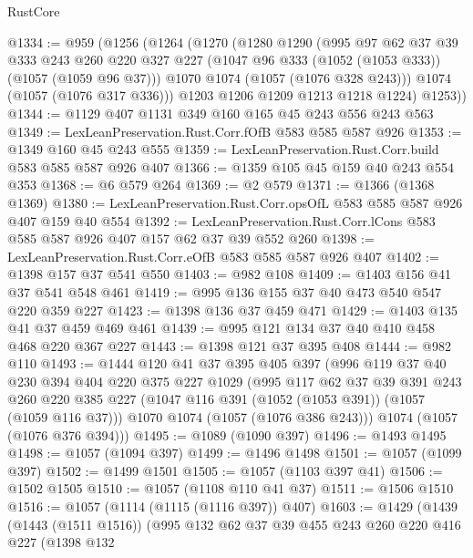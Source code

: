 \begin{lexlean}{RustCore}
\begin{coremodule}
@1334 := @959
    (@1256
      (@1264
        (@1270
          (@1280
            @1290
            (@995
              @97
              @62
              @37
              @39
              @333
              @243
              @260
              @220
              @327
              @227
              (@1047 @96 @333 (@1052 (@1053 @333)) (@1057 (@1059 @96 @37)))
              @1070
              @1074
              (@1057 (@1076 @328 @243)))
            @1074
            (@1057 (@1076 @317 @336)))
          @1203
          @1206
          @1209
          @1213
          @1218
          @1224)
        @1253))
@1344 := @1129 @407 @1131 @349 @160 @165 @45 @243 @556 @243 @563
@1349 := LexLeanPreservation.Rust.Corr.fOfB @583 @585 @587 @926
@1353 := @1349 @160 @45 @243 @555
@1359 := LexLeanPreservation.Rust.Corr.build @583 @585 @587 @926 @407
@1366 := @1359 @105 @45 @159 @40 @243 @554 @353
@1368 := @6 @579 @264
@1369 := @2 @579
@1371 := @1366 (@1368 @1369)
@1380 := LexLeanPreservation.Rust.Corr.opsOfL @583 @585 @587 @926 @407 @159 @40 @554
@1392 := LexLeanPreservation.Rust.Corr.lCons @583 @585 @587 @926 @407 @157 @62 @37 @39 @552 @260
@1398 := LexLeanPreservation.Rust.Corr.eOfB @583 @585 @587 @926 @407
@1402 := @1398 @157 @37 @541 @550
@1403 := @982 @108
@1409 := @1403 @156 @41 @37 @541 @548 @461
@1419 := @995 @136 @155 @37 @40 @473 @540 @547 @220 @359 @227
@1423 := @1398 @136 @37 @459 @471
@1429 := @1403 @135 @41 @37 @459 @469 @461
@1439 := @995 @121 @134 @37 @40 @410 @458 @468 @220 @367 @227
@1443 := @1398 @121 @37 @395 @408
@1444 := @982 @110
@1493 := @1444
    @120
    @41
    @37
    @395
    @405
    @397
    (@996
      @119
      @37
      @40
      @230
      @394
      @404
      @220
      @375
      @227
      @1029
      (@995
        @117
        @62
        @37
        @39
        @391
        @243
        @260
        @220
        @385
        @227
        (@1047 @116 @391 (@1052 (@1053 @391)) (@1057 (@1059 @116 @37)))
        @1070
        @1074
        (@1057 (@1076 @386 @243)))
      @1074
      (@1057 (@1076 @376 @394)))
@1495 := @1089 (@1090 @397)
@1496 := @1493 @1495
@1498 := @1057 (@1094 @397)
@1499 := @1496 @1498
@1501 := @1057 (@1099 @397)
@1502 := @1499 @1501
@1505 := @1057 (@1103 @397 @41)
@1506 := @1502 @1505
@1510 := @1057 (@1108 @110 @41 @37)
@1511 := @1506 @1510
@1516 := @1057 (@1114 (@1115 (@1116 @397)) @407)
@1603 := @1429
    (@1439
      (@1443 (@1511 @1516))
      (@995
        @132
        @62
        @37
        @39
        @455
        @243
        @260
        @220
        @416
        @227
        (@1398
          @132

\end{coremodule}
\end{lexlean}
